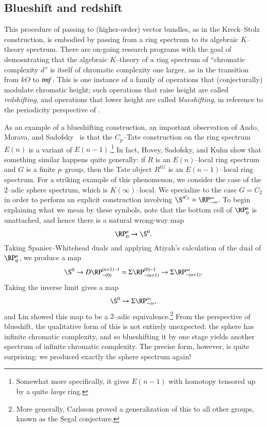 \subsection*{Blueshift and redshift}

This procedure of passing to (higher-order) vector bundles, as in the Kreck--Stolz construction, is embodied by passing from a ring spectrum to its algebraic $K$--theory spectrum.  There are on-going research programs with the goal of demosntrating that the algebraic $K$--theory of a ring spectrum of ``chromatic complexity $d$'' is itself of chromatic complexity one larger, as in the transition from $kO$ to $\mathit{tmf}$.  This is one instance of a family of operations that (conjecturally) modulate chromatic height; such operations that raise height are called \textit{redshifting}, and operations that lower height are called \textit{blueshifting}, in reference to the periodicity perspective of .

As an example of a blueshifting construction, an important observation of Ando, Morava, and Sadofsky~\cite{AMS} is that the $C_p$--Tate construction on the ring spectrum $E(n)$ is a variant of $E(n-1)$.\footnote{Somewhat more specifically, it gives $E(n-1)$ with homotopy tensored up by a quite \emph{large} ring.}  In fact, Hovey, Sadofsky, and Kuhn show that something similar happens quite generally: if $R$ is an $E(n)$--local ring spectrum and $G$ is a finite $p$--group, then the Tate object $R^{tG}$ is an $E(n-1)$--local ring spectrum.  For a striking example of this phenomenon, we consider the case of the $2$--adic sphere spectrum, which is $K(\infty)$--local.  We specialize to the case $G = C_2$ in order to perform an explicit construction involving $\S^{tC_2} \simeq \RP^\infty_{-\infty}$.  To begin explaining what we mean by these symbols, note that the bottom cell of $\RP^n_0$ is unattached, and hence there is a natural wrong-way map \[\RP^n_0 \to \S^0.\]  Taking Spanier--Whitehead duals and applying Atiyah's calculation of the dual of $\RP^n_0$, we produce a map \[\S^0 \to D \RP^{(n+1)-1}_{-(0)} = \Susp \RP^{(0)-1}_{-(n+1)} \to \Susp \RP^\infty_{-(n+1)}.\]  Taking the inverse limit gives a map \[\S^0 \to \Susp \RP^\infty_{-\infty},\] and Lin showed this map to be a $2$--adic equivalence.\footnote{More generally, Carlsson proved a generalization of this to all other groups, known as the Segal conjecture.}  From the perspective of blueshift, the qualitative form of this is not entirely unexpected: the sphere has infinite chromatic complexity, and so blueshifting it by one stage yields another spectrum of infinite chromatic complexity.  The precise form, however, is quite surprising: we produced exactly the sphere spectrum again!

